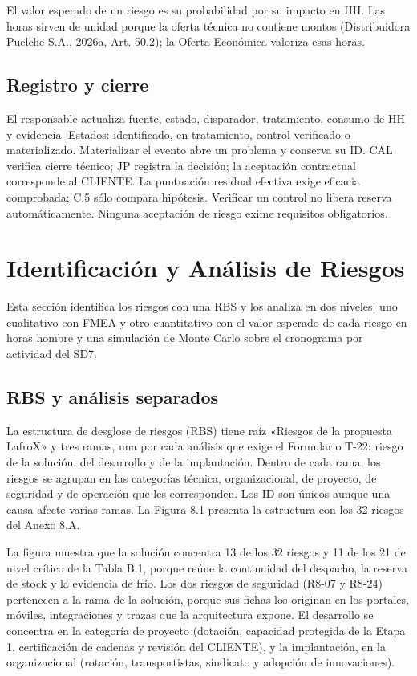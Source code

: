 El valor esperado de un riesgo es su probabilidad por su impacto en HH. Las horas sirven de unidad porque la oferta técnica no contiene montos (Distribuidora Puelche S.A., 2026a, Art. 50.2); la Oferta Económica valoriza esas horas.

\subsection{Registro y cierre}

El responsable actualiza fuente, estado, disparador, tratamiento, consumo de HH y evidencia. Estados: identificado, en tratamiento, control verificado o materializado. Materializar el evento abre un problema y conserva su ID. CAL verifica cierre técnico; JP registra la decisión; la aceptación contractual corresponde al CLIENTE. La puntuación residual efectiva exige eficacia comprobada; C.5 sólo compara hipótesis. Verificar un control no libera reserva automáticamente. Ninguna aceptación de riesgo exime requisitos obligatorios.

\section{Identificación y Análisis de Riesgos}

Esta sección identifica los riesgos con una RBS y los analiza en dos niveles: uno cualitativo con FMEA y otro cuantitativo con el valor esperado de cada riesgo en horas hombre y una simulación de Monte Carlo sobre el cronograma por actividad del SD7.

\subsection{RBS y análisis separados}

La estructura de desglose de riesgos (RBS) tiene raíz «Riesgos de la propuesta LafroX» y tres ramas, una por cada análisis que exige el Formulario T-22: riesgo de la solución, del desarrollo y de la implantación. Dentro de cada rama, los riesgos se agrupan en las categorías técnica, organizacional, de proyecto, de seguridad y de operación que les corresponden. Los ID son únicos aunque una causa afecte varias ramas. La Figura 8.1 presenta la estructura con los 32 riesgos del Anexo 8.A.


La figura muestra que la solución concentra 13 de los 32 riesgos y 11 de los 21 de nivel crítico de la Tabla B.1, porque reúne la continuidad del despacho, la reserva de stock y la evidencia de frío. Los dos riesgos de seguridad (R8-07 y R8-24) pertenecen a la rama de la solución, porque sus fichas los originan en los portales, móviles, integraciones y trazas que la arquitectura expone. El desarrollo se concentra en la categoría de proyecto (dotación, capacidad protegida de la Etapa 1, certificación de cadenas y revisión del CLIENTE), y la implantación, en la organizacional (rotación, transportistas, sindicato y adopción de innovaciones).


